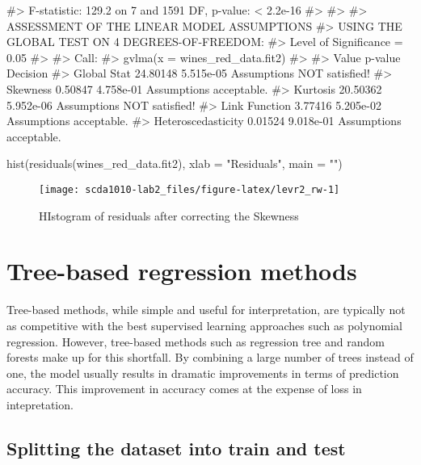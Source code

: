 \begin{Schunk}
\begin{Soutput}
#> F-statistic: 129.2 on 7 and 1591 DF,  p-value: < 2.2e-16
#> 
#> 
#> ASSESSMENT OF THE LINEAR MODEL ASSUMPTIONS
#> USING THE GLOBAL TEST ON 4 DEGREES-OF-FREEDOM:
#> Level of Significance =  0.05 
#> 
#> Call:
#>  gvlma(x = wines_red_data.fit2) 
#> 
#>                       Value   p-value                   Decision
#> Global Stat        24.80148 5.515e-05 Assumptions NOT satisfied!
#> Skewness            0.50847 4.758e-01    Assumptions acceptable.
#> Kurtosis           20.50362 5.952e-06 Assumptions NOT satisfied!
#> Link Function       3.77416 5.205e-02    Assumptions acceptable.
#> Heteroscedasticity  0.01524 9.018e-01    Assumptions acceptable.
\end{Soutput}
\end{Schunk}

\begin{Schunk}
\begin{Sinput}
hist(residuals(wines_red_data.fit2), xlab = "Residuals", main = "")
\end{Sinput}
\begin{figure}[h]

{\centering \texttt{[image: scda1010-lab2\_files/figure-latex/levr2\_rw-1]} 

}

\caption[HIstogram of residuals after correcting the Skewness]{HIstogram of residuals after correcting the Skewness}\label{fig:levr2_rw}
\end{figure}
\end{Schunk}

\hypertarget{tree-based-regression-methods}{%
\section{Tree-based regression
methods}\label{tree-based-regression-methods}}

Tree-based methods, while simple and useful for interpretation, are
typically not as competitive with the best supervised learning
approaches such as polynomial regression. However, tree-based methods
such as regression tree and random forests make up for this shortfall.
By combining a large number of trees instead of one, the model usually
results in dramatic improvements in terms of prediction accuracy. This
improvement in accuracy comes at the expense of loss in intepretation.

\hypertarget{splitting-the-dataset-into-train-and-test}{%
\subsection{Splitting the dataset into train and
test}\label{splitting-the-dataset-into-train-and-test}}

